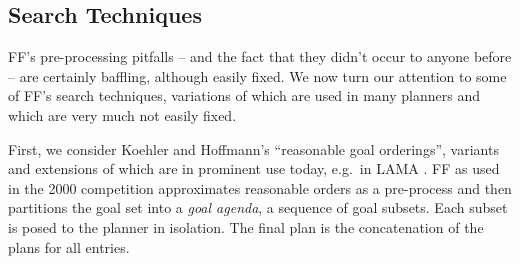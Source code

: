 \subsection{Search Techniques}
\label{sec:crisp-ff:preprocess:heuristics}





FF's pre-processing pitfalls -- and the fact that they didn't occur to
anyone before -- are certainly baffling, although easily fixed. We now
turn our attention to some of FF's search techniques, variations of
which are used in many planners and which are very much not easily
fixed.




First, we consider Koehler and Hoffmann's
 ``reasonable goal orderings'',
variants and extensions of which are in prominent use today, e.g.\ in
LAMA \cite{richter:etal:aaai-08}. FF as used in the 2000 competition
approximates reasonable orders as a pre-process and then partitions
the goal set into a {\em goal agenda}, a sequence of goal
subsets. Each subset is posed to the planner in isolation. The final
plan is the concatenation of the plans for all entries.


